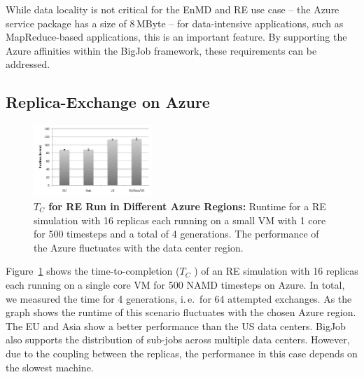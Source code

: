 \documentclass[conference,final]{IEEEtran}
\newcommand{\up}{\vspace*{-1em}}
\newcommand{\tc}{$T_{C}$ }
\begin{document}

While data locality is not critical for the EnMD and RE use case --
the Azure service package has a size of 8\,MByte -- for data-intensive
applications, such as MapReduce-based applications, this is an
important feature. By supporting the Azure affinities within the
BigJob framework, these requirements can be addressed.
\up
\subsection{Replica-Exchange on Azure}
\up
\begin{figure}[htbp]
    \centering
        \includegraphics[width=0.4\textwidth]{performance/repex_runtime_per_region.pdf}
    \caption{\textbf{\tc for RE Run in Different Azure Regions:} Runtime for a RE simulation with 
    16 replicas each running on a small VM with 1 core for 500 timesteps and a total of 4 generations. The performance of
    the Azure fluctuates with the data center region. \up}
    \label{fig:performance_repex_runtime_per_region}
    \up
\end{figure}

Figure~\ref{fig:performance_repex_runtime_per_region} shows the
time-to-completion (\tc) of an RE simulation with 16 replicas each running on a single
core VM for 500 NAMD timesteps on Azure. In total, we measured the time for 4
generations, i.\,e.\ for 64 attempted exchanges. As the graph shows
the runtime of this scenario fluctuates with the chosen Azure
region. The EU and Asia show a better performance than the US data
centers. BigJob also supports the distribution of sub-jobs across
multiple data centers. However, due to the coupling between the
replicas, the performance in this case depends on the slowest machine.
\end{document}
